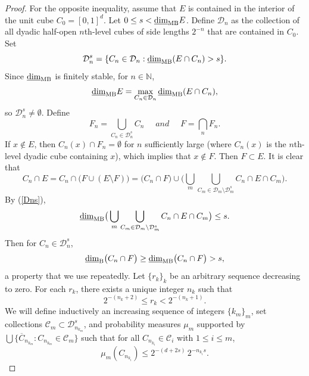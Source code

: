 \documentclass[12pt]{article}
\newcommand{\1}{{\bf 1}}
\newcommand{\D}{\mathcal{D}}
\newcommand\lbd{\underline{\mbox{\rm dim}}_{\rm B}} %
\newcommand\mlbd{\underline{\mbox{\rm dim}}_{\rm MB}} %
\begin{document}
\begin{proof}
		
	For the opposite inequality, assume that $E$ is   contained in the interior of the unit cube $C_0=[0,1]^d$. Let $0\leq s<\mlbd E$.		
	Define $\D_n$ as the collection of all dyadic half-open $n$th-level cubes of side lengths $2^{-n}$ that are contained in $C_0$.
	Set
	\begin{equation}\label{Dns}
		\D_n^s=\{C_n\in \D_n: \mlbd(E\cap C_n)>s\}.
	\end{equation}
   Since $\mlbd$ is finitely stable, for   $n\in\mathbb{N}$, 
   $$\mlbd E=\max_{C_n\in \D_n}\mlbd(E\cap C_n),$$  
   so  $\D_n^s\neq\emptyset$.
	Define   $$F_n=\bigcup_{C_n\in \D_n^s}C_n \quad \textit{ and }\quad F=\bigcap_n F_n.$$ 
	If $x\notin E$, then  $C_n(x)\cap F_n=\emptyset$ for $n$ sufficiently large    (where $C_n(x)$ is the $n$th-level dyadic cube containing $x$), which implies that  $x\notin F$. Then $	F\subset  E$.
	 It is clear that
	\begin{equation*}
		C_n\cap E=C_n\cap \big(F\cup(E\setminus F)\big)=\big(C_n\cap F\big)\cup\big(\bigcup_m\bigcup_{C_m\in\D_m\setminus\D_m^s}C_n\cap E\cap C_m\big).
	\end{equation*}
	 By   (\ref{Dns}), 
	 $$\mlbd\big(\bigcup_m\bigcup_{C_m\in\D_m\setminus\D_m^s}C_n\cap E\cap C_m\big)\leq s.$$ 
	 Then for $C_n\in \D_n^s$,
	\begin{equation}\label{ineq-s}
		\lbd\big(C_n\cap F\big)\geq \mlbd\big(C_n\cap F\big)>s,
	\end{equation}
a property that we use repeatedly.	 Let $\{r_k\}_k$ be an arbitrary   sequence decreasing to zero. 
For each $r_k$, there exists a unique integer $n_k$ such that
	\begin{equation}\label{rknk}
		2^{-(n_k+2)}\leq r_k< 2^{-(n_k+1)}.
	\end{equation}
We will define inductively an increasing sequence of integers $\{k_m\}_m$, set collections  $\mathcal{C}_{m} \subset  \D_{n_{k_m}}^s$, and probability measures $\mu_m$ 
supported by $\bigcup \{\overline{C}_{n_{k_m}}: C_{n_{k_m}} \in\mathcal{C}_{m}\}$
such that for all  $C_{n_{k_i}}\in\mathcal{C}_{i}$ with $1\leq i\leq m$,
\begin{equation}\label{indcon}
		\mu_m(C_{n_{k_i}})\leq  2^{-(d+2s)}\,2^{-n_{k_i}s}.
\end{equation}


\end{proof}
\end{document}
